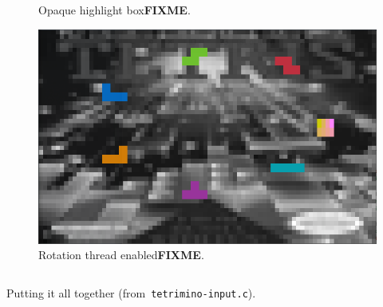 \begin{figure}[!htbp]
\begin{minipage}{0.30\textwidth}
    \caption{Opaque highlight box\textbf{FIXME}.}
  \end{minipage}\hfill
  \begin{minipage}{0.30\textwidth}
    \includegraphics[width=1\linewidth]{media/tetrimino-bg.png}
    \caption{Rotation thread enabled\textbf{FIXME}.}
  \end{minipage}\hfill
\end{figure}

\begin{listing}[!htbp]
\inputminted[]{C}{code/tetrimino-inputmain.h}
\caption{Putting it all together (from~\texttt{tetrimino-input.c}).}
\label{list:tetrimino-inputmain}
\end{listing}
